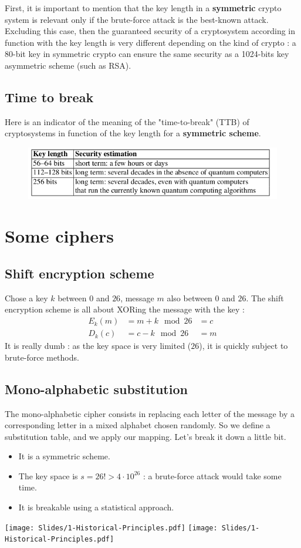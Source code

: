 \documentclass[../Cryptography.tex]{subfiles}
\begin{document}
First, it is important to mention that the key length in a \textbf{symmetric} crypto system is relevant only if the brute-force attack is the best-known attack. \\

Excluding this case, then the guaranteed security of a cryptosystem according in function with the key length is very different depending on the kind of crypto : a 80-bit key in symmetric crypto can ensure the same security as a 1024-bits key asymmetric scheme (such as RSA).

\subsection{Time to break}
Here is an indicator of the meaning of the "time-to-break" (TTB) of cryptosystems in function of the key length for a \textbf{symmetric scheme}.
\begin{figure}[h]
    \centering
    \includegraphics[width=0.7\linewidth]{images/1-TTB.png}
\end{figure}
\section{Some ciphers}
\subsection{Shift encryption scheme}
Chose a key $k$ between $0$ and $26$, message $m$ also between $0$ and $26$. The shift encryption scheme is all about XORing the message with the key :
$$
\begin{array}{lll}
    E_k(m) &= m + k \mod{26} &= c \\
    D_k(c) &= c - k \mod{26} &= m
\end{array}$$
It is really dumb : as the key space is very limited ($26$), it is quickly subject to brute-force methods.
\subsection{Mono-alphabetic substitution}
The mono-alphabetic cipher consists in replacing each letter of the message by a corresponding letter in a mixed alphabet chosen randomly. So we define a substitution table, and we apply our mapping. Let's break it down a little bit.
\begin{itemize}
    \item It is a symmetric scheme.
    \item The key space is $s = 26! > 4\cdot 10 ^{26}$ : a brute-force attack would take some time.
    \item It is breakable using a statistical approach.
\end{itemize}
\begin{center}
    \texttt{[image: Slides/1-Historical-Principles.pdf]}
    \texttt{[image: Slides/1-Historical-Principles.pdf]}
\end{center}
\end{document}
